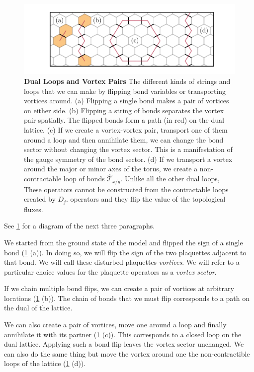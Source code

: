 \begin{figure}
\hypertarget{fig:types_of_dual_loops_animated}{%
\centering
\includegraphics[width=1\textwidth,height=\textheight]{figure_code/amk_chapter/intro/types_of_dual_loops_animated/types_of_dual_loops_animated.pdf}
\caption{\textbf{Dual Loops and Vortex Pairs} The different kinds of strings and loops that we can make by flipping bond variables or transporting vortices around. (a) Flipping a single bond makes a pair of vortices on either side. (b) Flipping a string of bonds separates the vortex pair spatially. The flipped bonds form a path (in red) on the dual lattice. (c) If we create a vortex-vortex pair, transport one of them around a loop and then annihilate them, we can change the bond sector without changing the vortex sector. This is a manifestation of the gauge symmetry of the bond sector. (d) If we transport a vortex around the major or minor axes of the torus, we create a non-contractable loop of bonds \(\hat{\mathcal{T}}_{x/y}\). Unlike all the other dual loops, These operators cannot be constructed from the contractable loops created by \(D_j\). operators and they flip the value of the topological fluxes.}\label{fig:types_of_dual_loops_animated}
}
\end{figure}

See \cref{fig:types_of_dual_loops_animated} for a diagram of the next three paragraphs.

We started from the ground state of the model and flipped the sign of a single bond (\cref{fig:types_of_dual_loops_animated} (a)). In doing so, we will flip the sign of the two plaquettes adjacent to that bond. We will call these disturbed plaquettes \emph{vortices}. We will refer to a particular choice values for the plaquette operators as a \emph{vortex sector}.

If we chain multiple bond flips, we can create a pair of vortices at arbitrary locations (\cref{fig:types_of_dual_loops_animated} (b)). The chain of bonds that we must flip corresponds to a path on the dual of the lattice.

We can also create a pair of vortices, move one around a loop and finally annihilate it with its partner (\cref{fig:types_of_dual_loops_animated} (c)). This corresponds to a closed loop on the dual lattice. Applying such a bond flip leaves the vortex sector unchanged. We can also do the same thing but move the vortex around one the non-contractible loops of the lattice (\cref{fig:types_of_dual_loops_animated} (d)).

